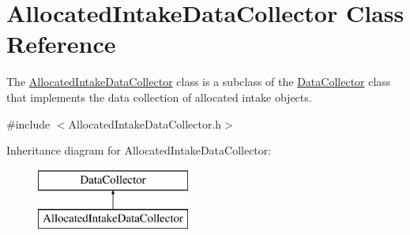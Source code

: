 \hypertarget{classAllocatedIntakeDataCollector}{}\section{Allocated\+Intake\+Data\+Collector Class Reference}
\label{classAllocatedIntakeDataCollector}


The {\ttfamily \mbox{\hyperlink{classAllocatedIntakeDataCollector}{Allocated\+Intake\+Data\+Collector}}} class is a subclass of the {\ttfamily \mbox{\hyperlink{classDataCollector}{Data\+Collector}}} class that implements the data collection of allocated intake objects.  




{\ttfamily \#include $<$Allocated\+Intake\+Data\+Collector.\+h$>$}

Inheritance diagram for Allocated\+Intake\+Data\+Collector\+:\begin{figure}[H]
\begin{center}
\leavevmode
\includegraphics[height=2.000000cm]{classAllocatedIntakeDataCollector}
\end{center}
\end{figure}
